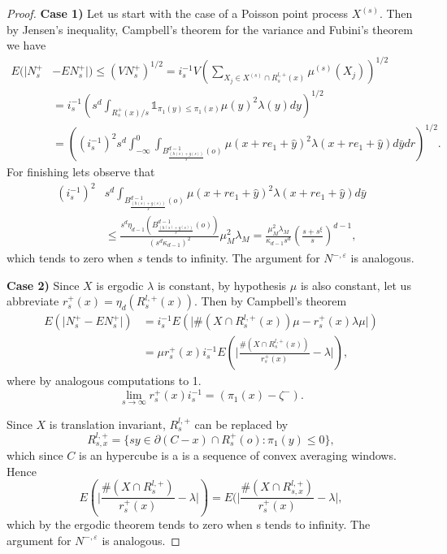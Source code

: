 \begin{proof}
\textbf{Case 1)} Let us start with the case of a Poisson point process $X^{(s)}$. Then by Jensen's inequality,  Campbell's theorem for the variance and Fubini's theorem we have
\begin{align}
E(\vert N_s^+&-EN_s^+\vert)\leq(VN^+_s)^{1/2}=i^{-1}_s V(\sum_{X_j\in X^{(s)}\cap R^{l,+}_{s}(x)}\mu^{(s)}(X_j))^{1/2}\nonumber\\
&=i^{-1}_s(s^d\int_{R^+_s(x)/s}\mathds{1}_{\pi_1(y)\leq \pi_1(x)}\mu(y)^2\lambda(y)dy)^{1/2}\nonumber\\
&=((i^{-1}_s)^2s^d\int_{-\infty}^0\int_{B^{d-1}_{\frac{(h(s)+g(s))}{s}}(o)}\mu(x+re_1+\hat{y})^2\lambda(x+re_1+\hat{y})d\bar{y}dr)^{1/2}\nonumber.
\end{align}
For finishing lets observe that
\begin{align}
(i^{-1}_s)^2& s^d\int_{B^{d-1}_{\frac{(h(s)+g(s))}{s}}(o)}\mu(x+re_1+\hat{y})^2\lambda(x+re_1+\hat{y})d\bar{y}\nonumber\\ &\leq \frac{s^d\eta_{d-1}(B^{d-1}_{\frac{(h(s)+g(s))}{s}}(o))}{(s^d\kappa_{d-1})^2}\mu_M^2\lambda_M
=\frac{\mu_M^2\lambda_M}{\kappa_{d-1}s^d}(\frac{s+s^\xi}{s})^{d-1}\nonumber,
\end{align}
which tends to zero when $s$ tends to infinity. The argument for $N^{-,\varepsilon}$ is analogous.

\textbf{Case 2)} Since $X$ is ergodic $\lambda$ is constant, by hypothesis $\mu$ is also constant, let us abbreviate $r^+_s(x)=\eta_d(R^{l,+}_s(x))$. Then by Campbell's theorem
\begin{align}
E(\vert N_s^+-EN_s^+\vert)&=i^{-1}_s E(\vert\#(X\cap R_{s}^{l,+}(x))\mu-r^+_s(x)\lambda\mu\vert)\nonumber\\
&=\mu r^+_s(x)i_s^{-1} E(\vert\frac{\#(X\cap R_{s}^{l,+}(x))}{r^+_s(x)}-\lambda\vert),\nonumber
\end{align}
where by analogous computations to 1. $$\lim_{s\rightarrow\infty} r^+_s(x)i_s^{-1}=(\pi_1(x)-\zeta^-).$$ 

Since $X$ is translation invariant, $R_s^{l,+}$ can be replaced by
$$R_{s,x}^{l,+}=\lbrace sy\in \partial(C-x)\cap R_s^+(o):\pi_1(y)\leq 0\rbrace, $$
which since $C$ is an hypercube is a is a sequence of convex averaging windows. Hence 
$$E(\vert\frac{\#(X\cap R_{s}^{l,+})}{r^+_s(x)}-\lambda\vert)=E(\vert\frac{\#(X\cap R_{s, x}^{l,+})}{r^+_s(x)}-\lambda\vert, $$
which by the ergodic theorem tends to zero when s tends to infinity. The argument for $N^{-,\varepsilon}$ is analogous. 
 \end{proof}
